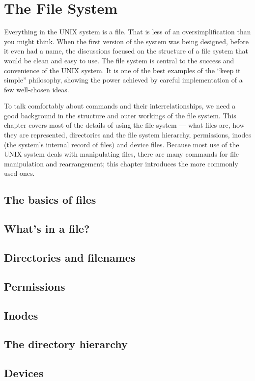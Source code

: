 \chapter{The File System}

Everything in the UNIX system is a file. That is less of an oversimplification
than you might think. When the first version of the system was being designed,
before it even had a name, the discussions focused on the structure of a file
system that would be clean and easy to use. The file system is central to the
success and convenience of the UNIX system. It is one of the best examples of
the ``keep it simple'' philosophy, showing the power achieved by careful
implementation of a few well-chosen ideas.

To talk comfortably about commands and their interrelationships, we need a good
background in the structure and outer workings of the file system. This chapter
covers most of the details of using the file system --- what files are, how they
are represented, directories and the file system hierarchy, permissions, inodes
(the system's internal record of files) and device files. Because most use of
the UNIX system deals with manipulating files, there are many commands for file
manipulation and rearrangement; this chapter introduces the more commonly used
ones.

\section{The basics of files}
\section{What's in a file?}
\section{Directories and filenames}
\section{Permissions}
\section{Inodes}
\section{The directory hierarchy}
\section{Devices}
